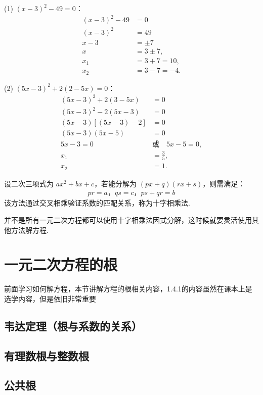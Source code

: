 \documentclass[lang=cn, 10pt, titlestyle=display, oneside]{elegantbook}
\begin{document}
\begin{solution}
\begin{multicols}{2}
(1) \((x-3)^2-49=0\)：
\begin{align*}
(x-3)^2 - 49 &= 0 \\
(x-3)^2 &= 49 \\
x-3 &= \pm 7 \\
x &= 3 \pm 7, \\
x_1 &= 3 + 7 = 10, \\
x_2 &= 3 - 7 = -4.
\end{align*}

(2) \((5x-3)^2+2(2-5x)=0\)：
\begin{align*}
(5x-3)^2 + 2(3-5x) &= 0 \\
(5x-3)^2 - 2(5x-3) &= 0 \\
(5x-3)\left[(5x-3) - 2\right] &= 0 \\
(5x-3)(5x-5) &= 0 \\
5x-3 = 0 \quad &\text{或} \quad 5x-5 = 0, \\
x_1 &= \frac{3}{5}, \\
x_2 &= 1.
\end{align*}
\end{multicols}
\end{solution}

设二次三项式为 $ax^2 + bx + c$，若能分解为 $(px + q)(rx + s)$，则需满足：
\begin{align*}
pr = a，
qs = c，ps + qr = b
\end{align*}
该方法通过交叉相乘验证系数的匹配关系，称为十字相乘法.
\par
并不是所有一元二次方程都可以使用十字相乘法因式分解，这时候就要灵活使用其他方法解方程.

\section{一元二次方程的根}

前面学习如何解方程，本节讲解方程的根相关内容，1.4.1的内容虽然在课本上是选学内容，但是依旧非常重要

\subsection{韦达定理（根与系数的关系）}

\subsection{有理数根与整数根}

\subsection{公共根}
\end{document}
